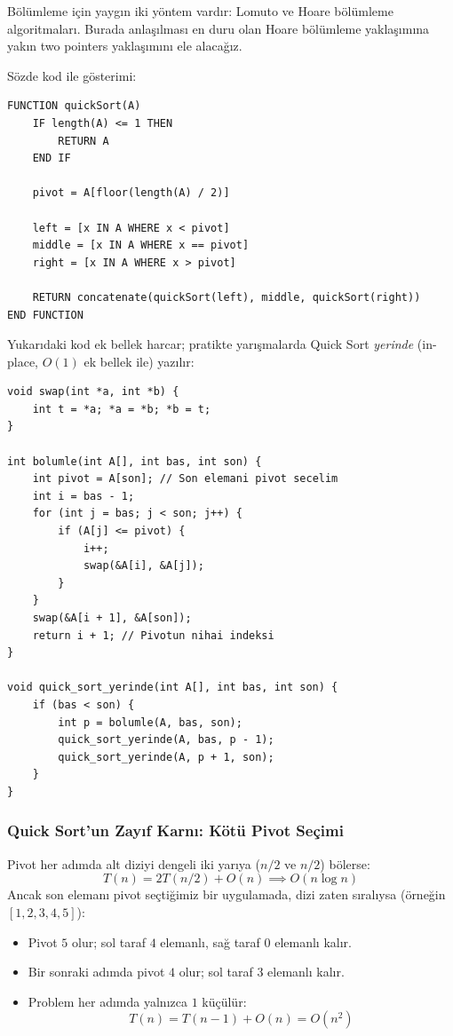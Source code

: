 Bölümleme için yaygın iki yöntem vardır: Lomuto ve Hoare bölümleme algoritmaları. Burada anlaşılması en duru olan Hoare bölümleme yaklaşımına yakın two pointers yaklaşımını ele alacağız.

Sözde kod ile gösterimi:
\begin{lstlisting}
FUNCTION quickSort(A)
    IF length(A) <= 1 THEN
        RETURN A
    END IF

    pivot = A[floor(length(A) / 2)]

    left = [x IN A WHERE x < pivot]
    middle = [x IN A WHERE x == pivot]
    right = [x IN A WHERE x > pivot]

    RETURN concatenate(quickSort(left), middle, quickSort(right))
END FUNCTION\end{lstlisting}

Yukarıdaki kod ek bellek harcar; pratikte yarışmalarda Quick Sort \emph{yerinde} (in-place, $O(1)$ ek bellek ile) yazılır:

\begin{lstlisting}[language=CTemel]
void swap(int *a, int *b) {
    int t = *a; *a = *b; *b = t;
}

int bolumle(int A[], int bas, int son) {
    int pivot = A[son]; // Son elemani pivot secelim
    int i = bas - 1;
    for (int j = bas; j < son; j++) {
        if (A[j] <= pivot) {
            i++;
            swap(&A[i], &A[j]);
        }
    }
    swap(&A[i + 1], &A[son]);
    return i + 1; // Pivotun nihai indeksi
}

void quick_sort_yerinde(int A[], int bas, int son) {
    if (bas < son) {
        int p = bolumle(A, bas, son);
        quick_sort_yerinde(A, bas, p - 1);
        quick_sort_yerinde(A, p + 1, son);
    }
}
\end{lstlisting}

\subsubsection{Quick Sort'un Zayıf Karnı: Kötü Pivot Seçimi}

Pivot her adımda alt diziyi dengeli iki yarıya ($n/2$ ve $n/2$) bölerse:
\[
T(n) = 2T(n/2) + O(n) \implies O(n \log n)
\]
Ancak son elemanı pivot seçtiğimiz bir uygulamada, dizi zaten sıralıysa (örneğin $[1, 2, 3, 4, 5]$):
\begin{itemize}
    \item Pivot $5$ olur; sol taraf $4$ elemanlı, sağ taraf $0$ elemanlı kalır.
    \item Bir sonraki adımda pivot $4$ olur; sol taraf $3$ elemanlı kalır.
    \item Problem her adımda yalnızca $1$ küçülür:
    \[
    T(n) = T(n-1) + O(n) = O(n^2)
    \]
\end{itemize}

